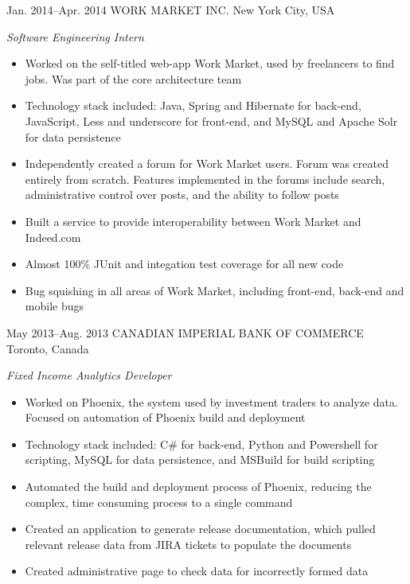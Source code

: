 \documentclass[]{friggeri-cv} %
\begin{document}
\begin{entrylist}
\entry
{Jan. 2014--Apr. 2014}
{WORK MARKET INC.}
{New York City, USA}
{\emph{Software Engineering Intern} \\
\begin{itemize}
	\item Worked on the self-titled web-app Work Market, used by freelancers to find jobs. Was part of the core architecture team
	\item Technology stack included: Java, Spring and Hibernate for back-end, JavaScript, Less and underscore for front-end, and  MySQL and Apache Solr for data persistence
	\item Independently created a forum for Work Market users. Forum was created entirely from scratch. Features implemented in the forums include search, administrative control over posts, and the ability to follow posts 
	\item Built a service to provide interoperability between Work Market and Indeed.com
	\item Almost 100\% JUnit and integation test coverage for all new code 
	\item Bug squishing in all areas of Work Market, including front-end, back-end and mobile bugs
\end{itemize}
}
\end{entrylist}

\begin{entrylist}
\entry
{May 2013--Aug. 2013}
{CANADIAN IMPERIAL BANK OF COMMERCE}
{Toronto, Canada}
{\emph{Fixed Income Analytics Developer} \\
\begin{itemize}
	\item Worked on Phoenix, the system used by investment traders to analyze data. Focused on automation of Phoenix build and deployment
	\item Technology stack included: C\# for back-end, Python and Powershell for scripting, MySQL for data persistence, and MSBuild for build scripting
	\item Automated the build and deployment process of Phoenix, reducing the complex, time consuming process to a single command
	\item Created an application to generate release documentation, which pulled relevant release data from JIRA tickets to populate the documents
	\item Created administrative page to check data for incorrectly formed data
\end{itemize}
}
\end{entrylist}
\end{document}
